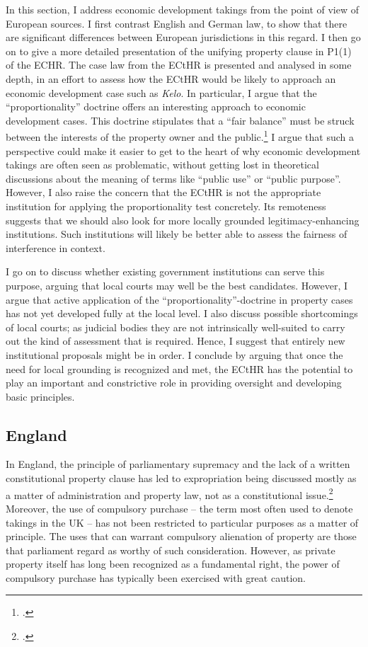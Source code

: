 \documentclass[12pt,a4paper]{book} %
\begin{document}
In this section, I address economic development takings from the point of view of European sources. I first contrast English and German law, to show that there are significant differences between European jurisdictions in this regard. I then go on to give a more detailed presentation of the unifying property clause in P1(1) of the ECHR. The case law from the ECtHR is presented and analysed in some depth, in an effort to assess how the ECtHR would be likely to approach an economic development case such as {\it Kelo}. In particular, I argue that the ``proportionality'' doctrine offers an interesting approach to economic development cases. This doctrine stipulates that a ``fair balance'' must be struck  between the interests of the property owner and the public.\footcite[Chapter 5]{allen05} I argue that such a perspective could make it easier to get to the heart of why economic development takings are often seen as problematic, without getting lost in theoretical discussions about the meaning of  terms like ``public use'' or ``public purpose''. However, I also raise the concern that the ECtHR is not the appropriate institution for applying the proportionality test concretely. Its remoteness suggests that we should also look for more locally grounded legitimacy-enhancing institutions. Such institutions will likely be better able to assess the fairness of interference in context.

I go on to discuss whether existing government institutions can serve this purpose, arguing that local courts may well be the best candidates. However, I argue that active application of the ``proportionality''-doctrine in property cases has not yet developed fully at the local level. I also discuss possible shortcomings of local courts; as judicial bodies they are not intrinsically well-suited to carry out the kind of assessment that is required. Hence, I suggest that entirely new institutional proposals might be in order. I conclude by arguing that once the need for local grounding is recognized and met, the ECtHR has the potential to play an important and constrictive role in providing oversight and developing basic principles.

\subsection{England}\label{sec:england}

In England, the principle of parliamentary supremacy and the lack of a written constitutional property clause has led to expropriation being discussed mostly as a matter of administration and property law, not as a constitutional issue.\footcite{taggart98} Moreover, the use of compulsory purchase -- the term most often used to denote takings in the UK -- has not been restricted to particular purposes as a matter of principle. The uses that can warrant compulsory alienation of property are those that parliament regard as worthy of such consideration. However, as private property itself has long been recognized as a fundamental right, the power of compulsory purchase has typically been exercised with great caution. 
\end{document}
